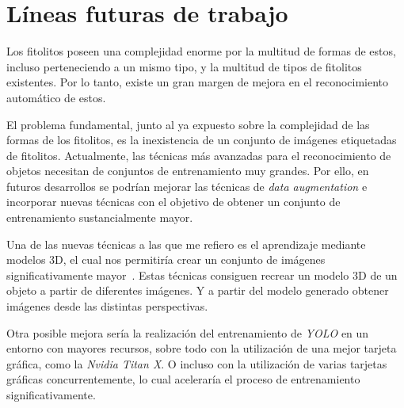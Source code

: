 \section{Líneas futuras de trabajo}

Los fitolitos poseen una complejidad enorme por la multitud de formas de estos, incluso perteneciendo a un mismo tipo, y la multitud de tipos de fitolitos existentes. Por lo tanto, existe un gran margen de mejora en el reconocimiento automático de estos.

El problema fundamental, junto al ya expuesto sobre la complejidad de las formas de los fitolitos, es la inexistencia de un conjunto de imágenes etiquetadas de fitolitos. Actualmente, las técnicas más avanzadas para el reconocimiento de objetos necesitan de conjuntos de entrenamiento muy grandes. Por ello, en futuros desarrollos se podrían mejorar las técnicas de \textit{data augmentation} e incorporar nuevas técnicas con el objetivo de obtener un conjunto de entrenamiento sustancialmente mayor.

Una de las nuevas técnicas a las que me refiero es el aprendizaje mediante modelos 3D, el cual nos permitiría crear un conjunto de imágenes significativamente mayor~\cite{sem,3dmodels}. Estas técnicas consiguen recrear un modelo 3D de un objeto a partir de diferentes imágenes. Y a partir del modelo generado obtener imágenes desde las distintas perspectivas.

Otra posible mejora sería la realización del entrenamiento de \textit{YOLO} en un entorno con mayores recursos, sobre todo con la utilización de una mejor tarjeta gráfica, como la \textit{Nvidia Titan X}. O incluso con la utilización de varias tarjetas gráficas concurrentemente, lo cual aceleraría el proceso de entrenamiento significativamente.
